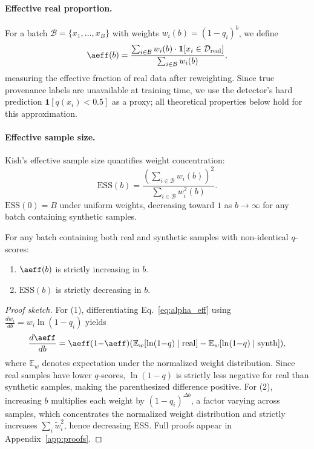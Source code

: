 \paragraph{Effective real proportion.}
For a batch $\mathcal{B} = \{x_1, \ldots, x_B\}$ with weights $w_i(b) = (1 - q_i)^b$, we define
\begin{equation}
  \aeff(b) = \frac{\sum_{i \in \mathcal{B}} w_i(b) \cdot \mathbf{1}[x_i \in \mathcal{D}_{\mathrm{real}}]}{\sum_{i \in \mathcal{B}} w_i(b)},
  \label{eq:alpha_eff}
\end{equation}
measuring the effective fraction of real data after reweighting.
Since true provenance labels are unavailable at training time, we use the detector's hard prediction $\mathbf{1}[q(x_i) < 0.5]$ as a proxy; all theoretical properties below hold for this approximation.

\paragraph{Effective sample size.}
Kish's effective sample size \citep{vehtari_2024_psis} quantifies weight concentration:
\begin{equation}
  \mathrm{ESS}(b) = \frac{\left(\sum_{i \in \mathcal{B}} w_i(b)\right)^2}{\sum_{i \in \mathcal{B}} w_i^2(b)}.
  \label{eq:ess}
\end{equation}
$\mathrm{ESS}(0) = B$ under uniform weights, decreasing toward $1$ as $b \to \infty$ for any batch containing synthetic samples.

\begin{proposition}[Monotonicity]
\label{prop:monotonicity}
For any batch containing both real and synthetic samples with non-identical $q$-scores:
\begin{enumerate}[leftmargin=*,nosep]
  \item $\aeff(b)$ is strictly increasing in $b$.
  \item $\mathrm{ESS}(b)$ is strictly decreasing in $b$.
\end{enumerate}
\end{proposition}

\begin{proof}[Proof sketch]
For (1), differentiating Eq.~\eqref{eq:alpha_eff} using $\frac{dw_i}{db} = w_i \ln(1 {-} q_i)$ yields
\begin{equation}
  \frac{d\aeff}{db} = \aeff(1 {-} \aeff) \!\left( \mathbb{E}_w[\ln(1{-}q) \mid \mathrm{real}] - \mathbb{E}_w[\ln(1{-}q) \mid \mathrm{synth}] \right)\!,
  \label{eq:dalpha}
\end{equation}
where $\mathbb{E}_w$ denotes expectation under the normalized weight distribution.
Since real samples have lower $q$-scores, $\ln(1{-}q)$ is strictly less negative for real than synthetic samples, making the parenthesized difference positive.
For (2), increasing $b$ multiplies each weight by $(1{-}q_i)^{\Delta b}$, a factor varying across samples, which concentrates the normalized weight distribution and strictly increases $\sum_i \tilde{w}_i^2$, hence decreasing ESS.
Full proofs appear in Appendix~\ref{app:proofs}.
\end{proof}

